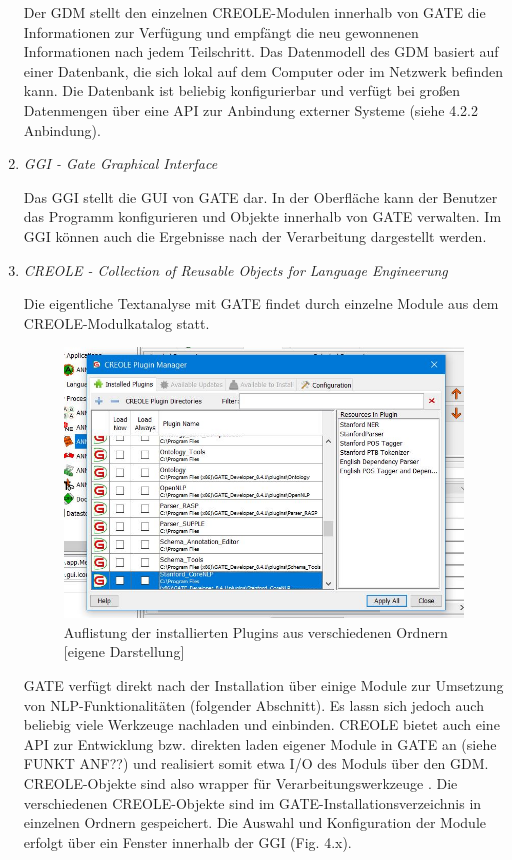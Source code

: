 \documentclass[12pt]{report}
\begin{document}
\begin{enumerate}
Der GDM stellt den einzelnen CREOLE-Modulen innerhalb von GATE die Informationen zur Verfügung und empfängt die neu gewonnenen Informationen nach jedem Teilschritt. Das Datenmodell des GDM basiert auf einer Datenbank, die sich lokal auf dem Computer oder im Netzwerk befinden kann. Die Datenbank ist beliebig konfigurierbar und verfügt bei großen Datenmengen über eine API zur Anbindung externer Systeme (siehe 4.2.2 \glqq  Anbindung\grqq{}). 
\item \textit{GGI - Gate Graphical Interface}

Das GGI stellt die GUI von GATE dar. In der Oberfläche kann der Benutzer das Programm konfigurieren und Objekte innerhalb von GATE verwalten. Im GGI können auch die Ergebnisse nach der Verarbeitung dargestellt werden.

\item \textit{CREOLE - Collection of Reusable Objects for Language Engineerung}

Die eigentliche Textanalyse mit GATE findet durch einzelne Module aus dem CREOLE-Modulkatalog statt.

\begin{figure}[h!]
\begin{center}
\includegraphics[scale=0.8]{GATE_Bilder/CREOLE.jpg}
\caption{Auflistung der installierten Plugins aus verschiedenen Ordnern [eigene Darstellung]}
\end{center}
\end{figure} 

GATE verfügt direkt nach der Installation über einige Module zur Umsetzung von NLP-Funktionalitäten (folgender Abschnitt). Es lassn sich jedoch auch beliebig viele Werkzeuge nachladen und einbinden. CREOLE bietet auch eine API zur Entwicklung bzw. direkten laden eigener Module in GATE an (siehe FUNKT ANF??) und realisiert somit etwa I/O des Moduls über den GDM. CREOLE-Objekte sind also wrapper für Verarbeitungswerkzeuge \cite{cu02}. 
Die verschiedenen CREOLE-Objekte sind im GATE-Installationsverzeichnis in einzelnen Ordnern gespeichert. Die Auswahl und Konfiguration der Module erfolgt über ein Fenster innerhalb der GGI (Fig. 4.x).
\end{enumerate}
\end{document}
